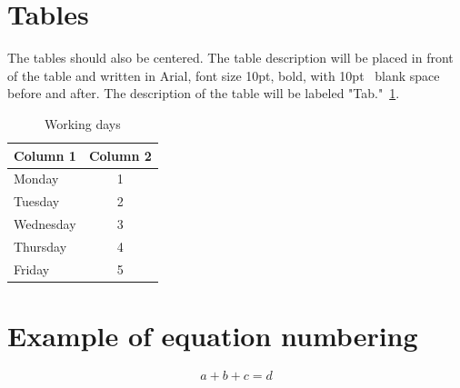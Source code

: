     \section{Tables}\label{sec:tables}
    The tables should also be centered. The table description will be
    placed in front of the table and written in Arial, font size 10pt,
    bold, with 10pt~\cite{Durbin} blank space before and after. The description of
    the table will be labeled "Tab."~\ref{tab:example}.
    \begin{table}[!ht]
        \centering
        \begin{tabular}{|l|c|}
            \hline
            Column 1 & Column 2 \\
            \hline
            Monday & 1 \\
            Tuesday & 2 \\
            Wednesday & 3 \\
            Thursday & 4 \\
            Friday & 5 \\
            \hline
        \end{tabular}
        \caption{Working days}
        \label{tab:example}
    \end{table}
    \section{Example of equation numbering}\label{sec:equation}
    \begin{equation}
        a + b + c = d
    \end{equation}
